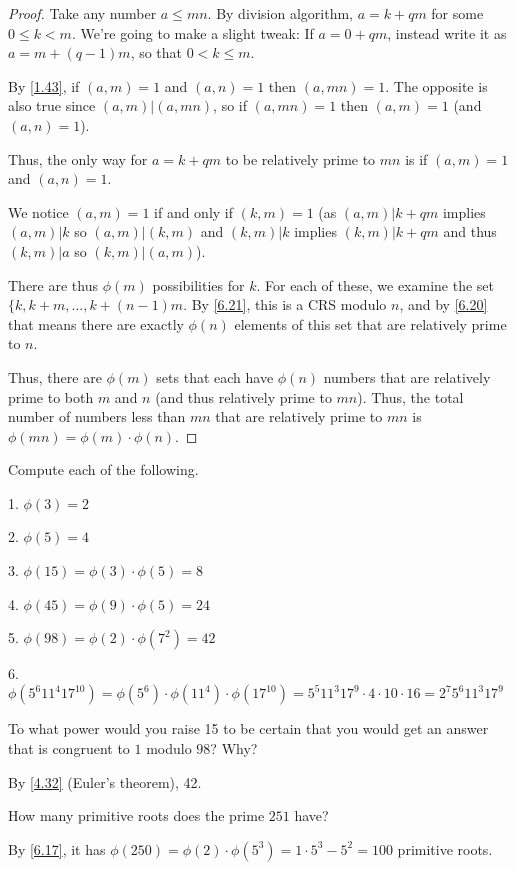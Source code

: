 \documentclass[../main.tex]{subfiles}
\begin{document}
\begin{proof}
  Take any number $a \leq mn$. By division algorithm, $a = k + qm$ for some $0 \leq k < m$. We're going to make a slight tweak: If $a = 0 + qm$, instead write it as $a = m + (q-1)m$, so that $0 < k \leq m$.

  By \ref{1.43}, if $(a, m) = 1$ and $(a, n) = 1$ then $(a, mn) = 1$. The opposite is also true since $(a, m) | (a, mn)$, so if $(a, mn) = 1$ then $(a, m) = 1$ (and $(a, n) = 1$).

  Thus, the only way for $a = k + qm$ to be relatively prime to $mn$ is if $(a, m) = 1$ and $(a, n) = 1$.

  We notice $(a, m) = 1$ if and only if $(k, m) = 1$ (as $(a, m) | k + qm$ implies $(a, m) | k$ so $(a, m) | (k, m)$ and $(k, m) | k$ implies $(k, m) | k + qm$ and thus $(k, m) | a$ so $(k, m) | (a, m)$).

  There are thus $\phi(m)$ possibilities for $k$. For each of these, we examine the set $\{k, k + m, \ldots, k + (n-1)m$. By \ref{6.21}, this is a CRS modulo $n$, and by \ref{6.20} that means there are exactly $\phi(n)$ elements of this set that are relatively prime to $n$.

  Thus, there are $\phi(m)$ sets that each have $\phi(n)$ numbers that are relatively prime to both $m$ and $n$ (and thus relatively prime to $mn$). Thus, the total number of numbers less than $mn$ that are relatively prime to $mn$ is $\phi(mn) = \phi(m) \cdot \phi(n)$.
\end{proof}



\begin{ex} \label{6.24}
  Compute each of the following.
\end{ex}

1. $\phi(3) = 2$

2. $\phi(5) = 4$

3. $\phi(15) = \phi(3) \cdot \phi(5) = 8$

4. $\phi(45) = \phi(9) \cdot \phi(5) = 24$

5. $\phi(98) = \phi(2) \cdot \phi(7^2) = 42$

6. $\phi(5^6 11^4 17^{10}) = \phi(5^6) \cdot \phi(11^4) \cdot \phi(17^{10}) = 5^5 11^3 17^9 \cdot 4 \cdot 10 \cdot 16 = 2^7 5^6 11^3 17^9$



\begin{ques} \label{6.25}
  To what power would you raise 15 to be certain that you would get an answer that is congruent to $1$ modulo $98$? Why?
\end{ques}

By \ref{4.32} (Euler's theorem), 42.



\begin{ques} \label{6.26}
  How many primitive roots does the prime $251$ have?
\end{ques}

By \ref{6.17}, it has $\phi(250) = \phi(2) \cdot \phi(5^3) = 1 \cdot 5^3 - 5^2 = 100$ primitive roots.
\end{document}
